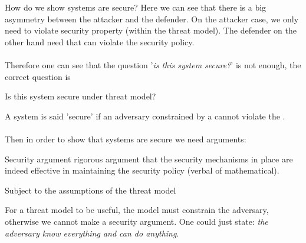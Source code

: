 \begin{parag}{How do we show systems are secure?}
    Here we can see that there is a big asymmetry between the attacker and the defender. On the attacker case, we only need  to violate  security property (within the threat model). The defender on the other hand need that  can violate the security policy.\\
	$ $\\
	Therefore one can see that the question '\textit{is this system secure?}' is not enough, the correct question is 
	\begin{center}
	    Is this system secure under  threat model?
	\end{center}
	A system is said 'secure' if an adversary constrained by a  cannot violate the .\\
	$ $\\
	Then in order to show that systems are secure we need arguments:
	\begin{definition}{Security argument}
	rigorous argument that the security mechanisms in place are indeed effective in maintaining the security policy (verbal of mathematical).\\
	\begin{center}
	    Subject to the assumptions of the threat model
	\end{center}
	\end{definition}
	For a threat model to be useful, the model must constrain the adversary, otherwise we cannot make a security argument. One could just state: \textit{the adversary know everything and can do anything}.

\end{parag}


